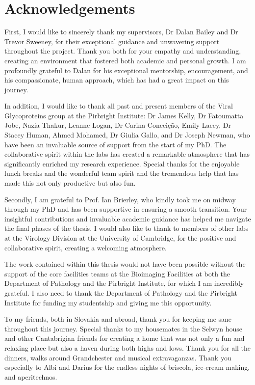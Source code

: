 \chapter{Acknowledgements}
First, I would like to sincerely thank my supervisors, Dr Dalan Bailey and Dr Trevor Sweeney, for their exceptional guidance and unwavering support throughout the project. Thank you both for your empathy and understanding, creating an environment that fostered both academic and personal growth. I am profoundly grateful to Dalan for his exceptional mentorship, encouragement, and his compassionate, human approach, which has had a great impact on this journey. 

In addition, I would like to thank all past and present members of the Viral Glycoproteins group at the Pirbright Institute: Dr James Kelly, Dr Fatoumatta Jobe, Nazia Thakur, Leanne Logan, Dr Carina Conceição, Emily Lacey, Dr Stacey Human, Ahmed Mohamed, Dr Giulia Gallo, and  Dr Joseph Newman, who have been an invaluable source of support from the start of my PhD. The collaborative spirit within the labs has created a remarkable atmosphere that has significantly enriched my research experience. Special thanks for the enjoyable lunch breaks and the wonderful team spirit and the tremendous help that has made this not only productive but also fun.

Secondly, I am grateful to Prof. Ian Brierley, who kindly took me on midway through my PhD and has been supportive in ensuring a smooth transition. Your insightful contributions and invaluable academic guidance has helped me navigate the final phases of the thesis. I would also like to thank to members of other labs at the Virology Division at the University of Cambridge, for the positive and collaborative spirit, creating a welcoming atmosphere.

The work contained within this thesis would not have been possible without the support of the core facilities teams at the Bioimaging Facilities at both the Department of Pathology and the Pirbright Institute, for which I am incredibly grateful. I also need to thank the Department of Pathology and the Pirbright Institute for funding my studentship and giving me this opportunity.

To my friends, both in Slovakia and abroad, thank you for keeping me sane throughout this journey. Special thanks to my housemates in the Selwyn house and other Cantabrigian friends for creating a home that was not only a fun and relaxing place but also a haven during both highs and lows. Thank you for all the dinners, walks around Grandchester and musical extravaganzas. Thank you especially to Albi and Darius for the endless nights of briscola, ice-cream making, and aperitechnos.

